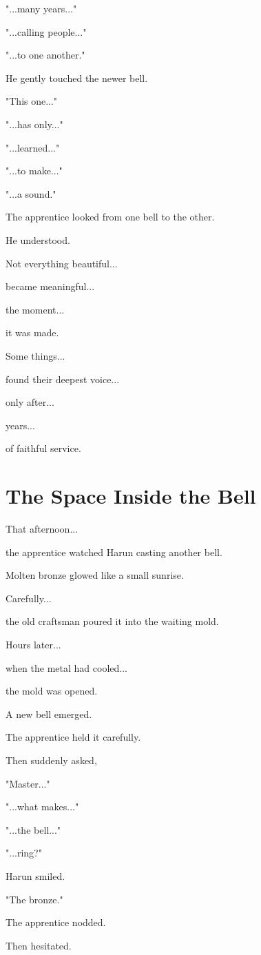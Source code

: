 \documentclass[12pt,openany]{book}
\begin{document}
"...many years..."

"...calling people..."

"...to one another."

He gently touched the newer bell.

"This one..."

"...has only..."

"...learned..."

"...to make..."

"...a sound."

The apprentice looked from one bell to the other.

He understood.

Not everything beautiful...

became meaningful...

the moment...

it was made.

Some things...

found their deepest voice...

only after...

years...

of faithful service.
\section*{The Space Inside the Bell}

That afternoon...

the apprentice watched Harun casting another bell.

Molten bronze glowed like a small sunrise.

Carefully...

the old craftsman poured it into the waiting mold.

Hours later...

when the metal had cooled...

the mold was opened.

A new bell emerged.

The apprentice held it carefully.

Then suddenly asked,

"Master..."

"...what makes..."

"...the bell..."

"...ring?"

Harun smiled.

"The bronze."

The apprentice nodded.

Then hesitated.
\end{document}
